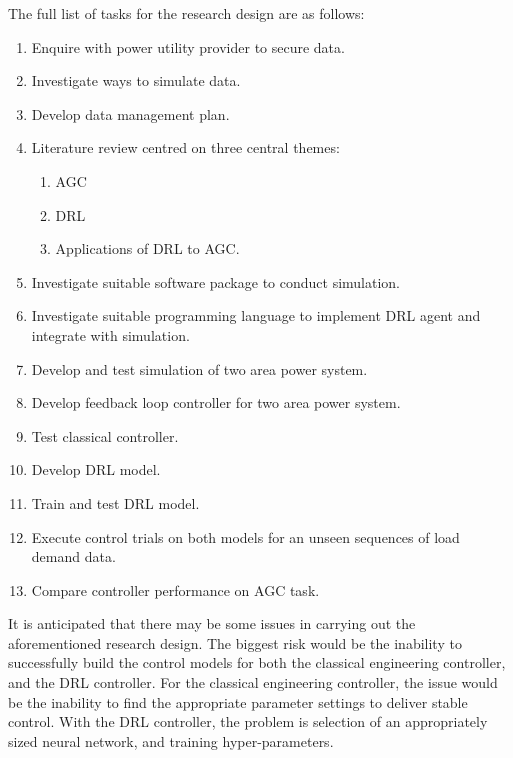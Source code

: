 The full list of tasks for the research design are as follows:
\begin{enumerate}
	\item Enquire with power utility provider to secure data.
	\item Investigate ways to simulate data.
	\item Develop data management plan.
	\item Literature review centred on three central themes:
	\begin{enumerate}
		\item AGC
		\item DRL
		\item Applications of DRL to AGC.
	\end{enumerate}
	\item Investigate suitable software package to conduct simulation.
	\item Investigate suitable programming language to implement DRL agent and integrate with simulation.
	\item Develop and test simulation of two area power system.
	\item Develop feedback loop controller for two area power system.
	\item Test classical controller.
	\item Develop DRL model.
	\item Train and test DRL model.
	\item Execute control trials on both models for an unseen sequences of load demand data.
	\item Compare controller performance on AGC task.
\end{enumerate}

It is anticipated that there may be some issues in carrying out the aforementioned research design. The biggest risk would be the inability to successfully build the control models for both the classical engineering controller, and the DRL controller. For the classical engineering controller, the issue would be the inability to find the appropriate parameter settings to deliver stable control. With the DRL controller, the problem is selection of an appropriately sized neural network, and training hyper-parameters.